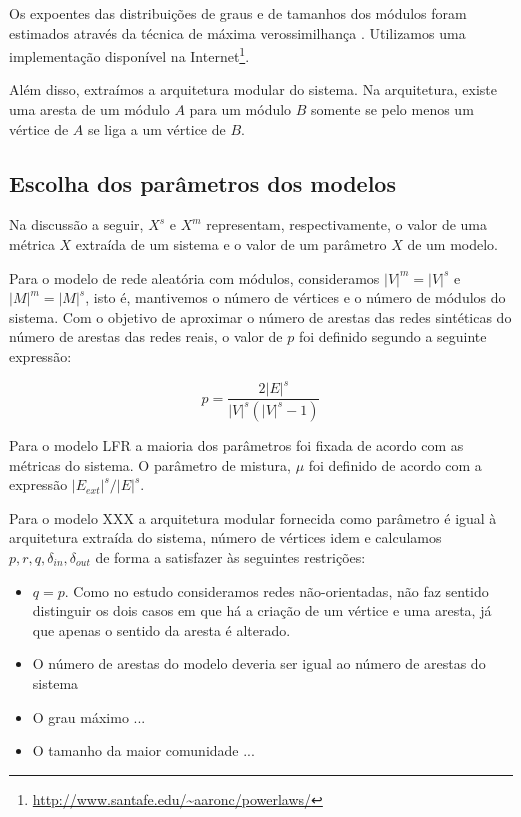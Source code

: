 \documentclass{acm_proc_article-sp}
\begin{document}
Os expoentes das distribuições de graus e de tamanhos dos módulos foram estimados através da técnica de máxima verossimilhança \cite{Clauset2007}. Utilizamos uma implementação disponível na Internet\footnote{\url{http://www.santafe.edu/~aaronc/powerlaws/}}.

Além disso, extraímos a arquitetura modular do sistema. Na arquitetura, existe uma aresta de um módulo $A$ para um módulo $B$ somente se pelo menos um vértice de $A$ se liga a um vértice de $B$.

\subsection{Escolha dos parâmetros dos modelos}

Na discussão a seguir, $X^s$ e $X^m$ representam, respectivamente, o valor de uma métrica $X$ extraída de um sistema e o valor de um parâmetro $X$ de um modelo.

Para o modelo de rede aleatória com módulos, consideramos $|V|^m = |V|^s$ e $|M|^m = |M|^s$, isto é,  mantivemos o número de vértices e o número de módulos do sistema. Com o objetivo de aproximar o número de arestas das redes sintéticas do número de arestas das redes reais, o valor de $p$ foi definido segundo a seguinte expressão:

\begin{equation}
p = \frac{2|E|^s}{|V|^s(|V|^s-1)}
\end{equation}

Para o modelo LFR a maioria dos parâmetros foi fixada de acordo com as métricas do sistema. O parâmetro de mistura, $\mu$ foi definido de acordo com a expressão $|E_{ext}|^s / |E|^s$.

Para o modelo XXX a arquitetura modular fornecida como parâmetro é igual à arquitetura extraída do sistema, número de vértices idem e calculamos $p, r, q, \delta_{in}, \delta_{out}$ de forma a satisfazer às seguintes restrições:
\begin{itemize}
  \item $q = p$. Como no estudo consideramos redes não-orientadas, não faz sentido distinguir os dois casos em que há a criação de um vértice e uma aresta, já que apenas o sentido da aresta é alterado.
  \item O número de arestas do modelo deveria ser igual ao número de arestas do sistema
  \item O grau máximo ...
  \item O tamanho da maior comunidade ...
\end{itemize}
\end{document}
